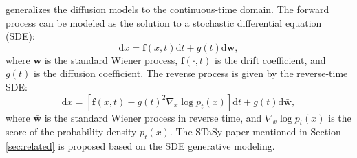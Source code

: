 \cite{song2021scorebased_sde} generalizes the diffusion models to the continuous-time domain. The forward process can be modeled as the solution to a stochastic differential equation (SDE):
\begin{equation}
    \mathrm{d}x=\boldsymbol{f}(x,t)\mathrm{d}t + g(t)\mathrm{d}\boldsymbol{w},
\end{equation}
where $\boldsymbol{w}$ is the standard Wiener process, $\boldsymbol{f}(\cdot,t)$ is the drift coefficient, and $g(t)$ is the diffusion coefficient. The reverse process is given by the reverse-time SDE:
\begin{equation}
    \mathrm{d}x=\left[\boldsymbol{f}(x,t)-g(t)^2\nabla_x\log p_t(x)\right]\mathrm{d}t + g(t)\mathrm{d}\bar{\boldsymbol{w}},
\end{equation}
where $\bar{\boldsymbol{w}}$ is the standard Wiener process in reverse time, and $\nabla_x\log p_t(x)$ is the score of the probability density $p_t(x)$. The STaSy paper \cite{kim2022stasy} mentioned in Section \ref{sec:related} is proposed based on the SDE generative modeling.
